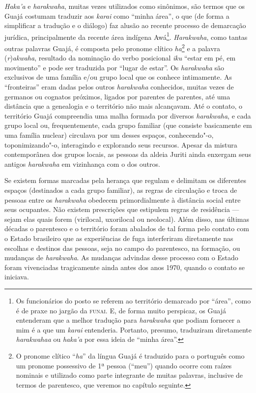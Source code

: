 \emph{Haka'a} e \emph{harakwaha}, muitas vezes utilizados como
sinônimos, são termos que os Guajá costumam traduzir aos \emph{karai}
como ``minha área'', o que (de forma a simplificar a tradução e o diálogo)
faz alusão ao recente processo de demarcação jurídica, principalmente da
recente área indígena Awá\footnote{Os funcionários do posto se
  referem ao território demarcado por ``área'', como é de praxe no jargão
  da \textsc{funai}. E, de forma muito perspicaz, os Guajá entenderam que a
  melhor tradução para \emph{harakwaha} que podiam fornecer a mim é a
  que um \emph{karai} entenderia. Portanto, presumo, traduziram
  diretamente \emph{harakwahaa} ou \emph{haka'a} por essa ideia de
  ``minha área''.}. \emph{Harakwaha}, como tantas outras palavras Guajá, é
composta pelo pronome clítico \emph{ha}\footnote{O pronome clítico
  ``\emph{ha}'' da língua Guajá é traduzido para o português como um
  pronome possessivo de 1ª pessoa (``meu'') quando ocorre com raízes
  nominais e utilizado como parte integrante de muitas palavras,
  inclusive de termos de parentesco, que veremos no capítulo seguinte.}
e a palavra (\emph{r})\emph{akwaha}, resultado da nominação do verbo
posicional \emph{iku} ``estar em pé, em movimento'' e pode ser traduzida
por ``lugar de estar''. Os \emph{harakwaha} são exclusivos de uma família
e/ou grupo local que os conhece intimamente. As ``fronteiras'' eram dadas
pelos outros \emph{harakwaha} conhecidos, muitas vezes de germanos ou
cognatos próximos, ligados por parentes de parentes, até uma distância
que a genealogia e o território não mais alcançavam. Até o contato, o
território Guajá compreendia uma malha formada por diversos
\emph{harakwaha}, e cada grupo local ou, frequentemente, cada grupo
familiar (que consiste basicamente em uma família nuclear) circulava por
um desses espaços, conhecendo"-o, toponimizando"-o, interagindo e
explorando seus recursos. Apesar da mistura contemporânea dos grupos
locais, as pessoas da aldeia Juriti ainda enxergam seus antigos
\emph{harakwaha} em vizinhança com o dos outros.

Se existem formas marcadas pela herança que regulam e delimitam os
diferentes espaços (destinados a cada grupo familiar), as regras de
circulação e troca de pessoas entre os \emph{harakwaha} obedecem
primordialmente à distância social entre seus ocupantes. Não existem
prescrições que estipulem regras de residência --- sejam elas quais forem
(virilocal, uxorilocal ou neolocal). Além disso, nas últimas décadas o
parentesco e o território foram abalados de tal forma pelo contato com o
Estado brasileiro que as experiências de fuga interferiram diretamente
nas escolhas e destinos das pessoas, seja no campo do parentesco, na
formação, ou mudanças de \emph{harakwaha}. As mudanças advindas desse
processo com o Estado foram vivenciadas tragicamente ainda antes dos
anos 1970, quando o contato se iniciava.

